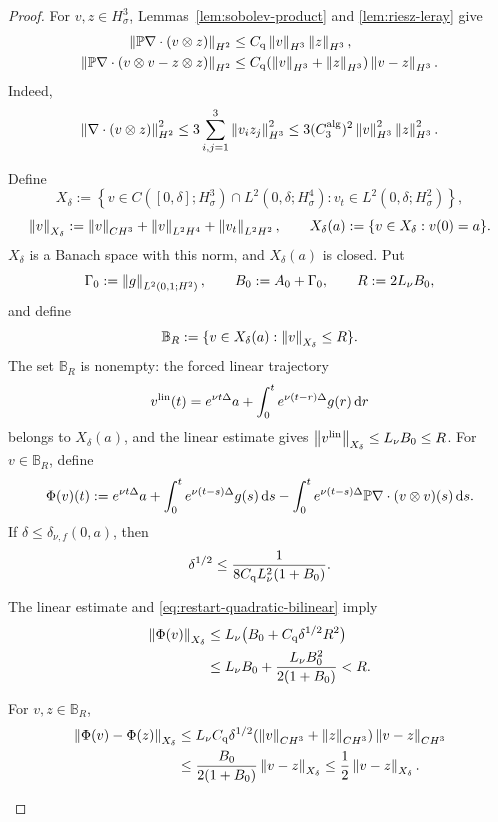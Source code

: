 \begin{proof}
For \(v,z\in H^3_\sigma\), Lemmas~\ref{lem:sobolev-product} and
\ref{lem:riesz-leray} give
\begin{align}
 \left\lVert \mathbb P\nabla\cdot(v\otimes z)\right\rVert_{H^2}
 &\le C_{\rm q}\left\lVert v\right\rVert_{H^3}\left\lVert z\right\rVert_{H^3},
 \label{eq:restart-quadratic-bilinear}\\
 \left\lVert \mathbb P\nabla\cdot(v\otimes v-z\otimes z)\right\rVert_{H^2}
 &\le C_{\rm q}(\left\lVert v\right\rVert_{H^3}+\left\lVert z\right\rVert_{H^3})
 \left\lVert v-z\right\rVert_{H^3}.
 \label{eq:restart-quadratic-difference}
\end{align}
Indeed,
\[
 \left\lVert \nabla\cdot(v\otimes z)\right\rVert_{H^2}^2
 \le3\sum_{i,j=1}^3\left\lVert v_i z_j\right\rVert_{H^3}^2
 \le3(C_3^{\rm alg})^2\left\lVert v\right\rVert_{H^3}^2\left\lVert z\right\rVert_{H^3}^2.
\]

Define
\[
 X_\delta:=
 \left\{v\in C([0,\delta];H^3_\sigma)\cap L^2(0,\delta;H^4_\sigma):
 v_t\in L^2(0,\delta;H^2_\sigma)\right\},
\]
\[
 \left\lVert v\right\rVert_{X_\delta}:=\left\lVert v\right\rVert_{C H^3}
 +\left\lVert v\right\rVert_{L^2H^4}+\left\lVert v_t\right\rVert_{L^2H^2},
 \qquad
 X_\delta(a):=\{v\in X_\delta:v(0)=a\}.
\]
\(X_\delta\) is a Banach space with this norm, and \(X_\delta(a)\) is closed.
Put
\[
 \Gamma_0:=\left\lVert g\right\rVert_{L^2(0,1;H^2)},
 \qquad B_0:=A_0+\Gamma_0,
 \qquad R:=2L_\nu B_0,
\]
and define
\[
 \mathbb B_R:=\{v\in X_\delta(a):\left\lVert v\right\rVert_{X_\delta}\le R\}.
\]
The set \(\mathbb B_R\) is nonempty: the forced linear trajectory
\[
 v^{\rm lin}(t)=e^{\nu t\Delta}a
 +\int_0^te^{\nu(t-r)\Delta}g(r)\,\mathrm d r
\]
belongs to \(X_\delta(a)\), and the linear estimate gives
\(\left\lVert v^{\rm lin}\right\rVert_{X_\delta}\le L_\nu B_0\le R\).
For \(v\in\mathbb B_R\), define
\[
 \Phi(v)(t):=e^{\nu t\Delta}a
 +\int_0^te^{\nu(t-s)\Delta}g(s)\,\mathrm d s
 -\int_0^te^{\nu(t-s)\Delta}
 \mathbb P\nabla\cdot(v\otimes v)(s)\,\mathrm d s.
\]
If \(\delta\le\delta_{\nu,f}(0,a)\), then
\[
 \delta^{1/2}\le
 \frac{1}{8C_{\rm q}L_\nu^2(1+B_0)}.
\]
\begin{samepage}
The linear estimate and \eqref{eq:restart-quadratic-bilinear} imply
\begin{align*}
 \left\lVert \Phi(v)\right\rVert_{X_\delta}
 &\le L_\nu\bigl(B_0+C_{\rm q}\delta^{1/2}R^2\bigr)\\
 &\le L_\nu B_0+\frac{L_\nu B_0^2}{2(1+B_0)}
 <R.
\end{align*}
\end{samepage}
\begin{samepage}
For \(v,z\in\mathbb B_R\),
\begin{align*}
 \left\lVert \Phi(v)-\Phi(z)\right\rVert_{X_\delta}
 &\le L_\nu C_{\rm q}\delta^{1/2}
 (\left\lVert v\right\rVert_{C H^3}+\left\lVert z\right\rVert_{C H^3})
 \left\lVert v-z\right\rVert_{C H^3}\\
 &\le\frac{B_0}{2(1+B_0)}\left\lVert v-z\right\rVert_{X_\delta}
 \le\frac12\left\lVert v-z\right\rVert_{X_\delta}.
\end{align*}

\end{samepage}
\end{proof}
